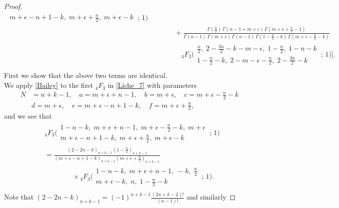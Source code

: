 \documentclass{article}
\theoremstyle{boldremark}
\renewcommand\[{\begin{equation}}
\renewcommand\]{\end{equation}}
\theoremstyle{definition}
\numberwithin{equation}{section}
\begin{document}
\begin{proof}
\begin{align}
\begin{matrix}
m+\epsilon-n+1-k,\; m+\epsilon+\frac{n}{2},\; m+\epsilon-k
\end{matrix}
\,;\,1\Biggr)
\\\nonumber
&\qquad\quad+
\frac{
\Gamma\!\left(\frac{n}{2}\right)\,
\Gamma(n-1 +m + \epsilon)\,
\Gamma\!\left(m+\epsilon+\frac{n}{2}-1\right)
}{ \Gamma(n-1) \,
\Gamma(m+\epsilon)\,
\Gamma(n-1)\,
\Gamma\!\left(1-\frac{n}{2}-k\right)\,
\Gamma\!\left(m+\epsilon-\frac{n}{2}-k\right)
}\\\nonumber
&\qquad\qquad
{}_4F_3\!\Biggl(
\begin{matrix}
\frac{n}{2},\; 2-\frac{3n}{2}-k-m-\epsilon,\; 1-\frac{n}{2},\; 1-n-k \\[4 pt]
1-\frac{n}{2}-k,\; 2-m-\epsilon-\frac{n}{2},\; 2-\frac{3n}{2}-k
\end{matrix}
\,;\,1\Biggr)
\Bigg].\\\label{Liche_8}
\end{align}
First we show that the above two terms are identical.
\\
We apply \eqref{Bailey} to the first $_4F_3$ in \eqref{Liche_7} with parameters
\begin{align*}
N &= n +k -1, \quad a = m + \epsilon + n -1, \quad b = m+\epsilon, \quad c = m + \epsilon - \frac{n}{2} - k\\[4 pt]
& d = m + \epsilon, \quad e = m+ \epsilon - n +1 -k, \quad f = m +\epsilon + \frac{n}{2},
\end{align*}
and we see that
\begin{align}\nonumber
&{}_4F_3\!\Biggl(
\begin{matrix}
1-n-k,\; m+\epsilon+n-1,\; m+\epsilon-\frac{n}{2}-k,\; m+\epsilon \\[4 pt]
m+\epsilon-n+1-k,\; m+\epsilon+\frac{n}{2},\; m+\epsilon-k
\end{matrix}
\,;\,1\Biggr) \\\nonumber
&= 
\frac{(2-2n-k)_{n+k-1} \left(1-\frac{n}{2}\right)_{n+k-1}}{(m+\epsilon-n+1-k)_{n+k-1} \left(m+\epsilon+\frac{n}{2}\right)_{n+k-1}} \\\nonumber
&\qquad\qquad \times {}_4F_3\!\Biggl(
\begin{matrix}
1-n-k,\; m+\epsilon+n-1,\; -k,\; \frac{n}{2} \\[4 pt]
m+\epsilon-k,\; n,\; 1-\frac{n}{2}-k
\end{matrix}
\,;\,1\Biggr).\\\label{nevim}
\end{align}
Note that $(2-2n-k)_{n+k-1} = (-1)^{n+k-1}\frac{(2n+k-2)!}{(n-1)!}$ and similarly 


\end{proof}
\end{document}
